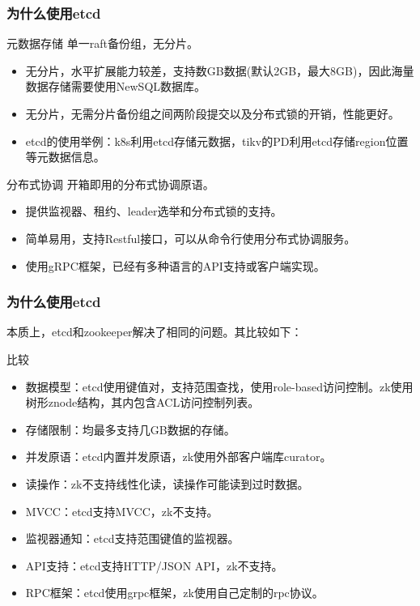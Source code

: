 \documentclass{beamer}
\begin{document}
%
%
\begin{frame}
\frametitle{为什么使用etcd}

\begin{exampleblock}{元数据存储}
单一raft备份组，无分片。
\begin{itemize}
    \item 无分片，水平扩展能力较差，支持数GB数据(默认2GB，最大8GB)，因此海量数据存储需要使用NewSQL数据库。
    \item 无分片，无需分片备份组之间两阶段提交以及分布式锁的开销，性能更好。
    \item etcd的使用举例：k8s利用etcd存储元数据，tikv的PD利用etcd存储region位置等元数据信息。
\end{itemize}
\end{exampleblock}

\begin{exampleblock}{分布式协调}
开箱即用的分布式协调原语。
\begin{itemize}
    \item 提供监视器、租约、leader选举和分布式锁的支持。
    \item 简单易用，支持Restful接口，可以从命令行使用分布式协调服务。
    \item 使用gRPC框架，已经有多种语言的API支持或客户端实现。
\end{itemize}
\end{exampleblock}

\end{frame}

%
%
\begin{frame}
\frametitle{为什么使用etcd}

本质上，etcd和zookeeper解决了相同的问题。其比较如下：

\begin{alertblock}{比较}
    \begin{itemize}
        \item 数据模型：etcd使用键值对，支持范围查找，使用role-based访问控制。zk使用树形znode结构，其内包含ACL访问控制列表。
        \item 存储限制：均最多支持几GB数据的存储。
        \item 并发原语：etcd内置并发原语，zk使用外部客户端库curator。
        \item 读操作：zk不支持线性化读，读操作可能读到过时数据。
        \item MVCC：etcd支持MVCC，zk不支持。
        \item 监视器通知：etcd支持范围键值的监视器。
        \item API支持：etcd支持HTTP/JSON API，zk不支持。
        \item RPC框架：etcd使用grpc框架，zk使用自己定制的rpc协议。
    \end{itemize}
\end{alertblock}

\end{frame}
\end{document}
